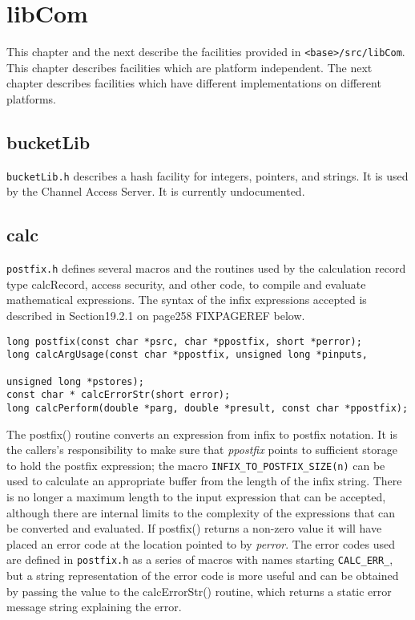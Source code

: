 \chapter{libCom}

This chapter and the next describe the facilities provided in \verb|<base>/src/libCom|. This chapter describes facilities 
which are platform independent. The next chapter describes facilities which have different implementations on different 
platforms.

\section{bucketLib}

\verb|bucketLib.h| describes a hash facility for integers, pointers, and strings. It is used by the Channel Access Server. It is 
currently undocumented.

\section{calc}

\verb|postfix.h| defines several macros and the routines used by the calculation record type calcRecord, access security, and 
other code, to compile and evaluate mathematical expressions. The syntax of the infix expressions accepted is described 
in Section19.2.1 on page258 FIXPAGEREF below.

\begin{verbatim}long postfix(const char *psrc, char *ppostfix, short *perror);
long calcArgUsage(const char *ppostfix, unsigned long *pinputs, 

unsigned long *pstores);
const char * calcErrorStr(short error);
long calcPerform(double *parg, double *presult, const char *ppostfix);
\end{verbatim}
The postfix() routine converts an expression from infix to postfix notation. It is the callers's responsibility to make sure 
that \emph{ppostfix} points to sufficient storage to hold the postfix expression; the macro \verb|INFIX_TO_POSTFIX_SIZE(n)| can 
be used to calculate an appropriate buffer from the length of the infix string. There is no longer a maximum length to the 
input expression that can be accepted, although there are internal limits to the complexity of the expressions that can be 
converted and evaluated. If postfix() returns a non-zero value it will have placed an error code at the location pointed to 
by \emph{perror}. The error codes used are defined in \verb|postfix.h| as a series of macros with names starting \verb|CALC_ERR_|, but a 
string representation of the error code is more useful and can be obtained by passing the value to the calcErrorStr() 
routine, which returns a static error message string explaining the error.


